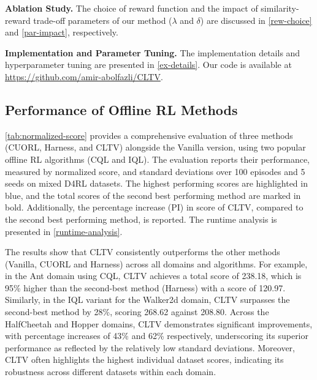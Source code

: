 \vspace{0.5em}
\noindent\textbf{Ablation Study.} The choice of reward function and the impact of similarity-reward trade-off parameters of our method (\(\lambda\) and \(\delta\)) are discussed in \autoref{rew-choice} and \autoref{par-impact}, respectively.


\vspace{0.5em}
\noindent\textbf{Implementation and Parameter Tuning.} The implementation details and hyperparameter tuning are presented in \autoref{ex-details}. Our code
is available at \href{https://github.com/amir-abolfazli/CLTV}{https://github.com/amir-abolfazli/CLTV}.



\subsection{Performance of Offline RL Methods}
\label{subsec-score}
\autoref{tab:normalized-score} provides a comprehensive evaluation of three methods (CUORL, Harness, and CLTV) alongside the Vanilla version, using two popular offline RL algorithms (CQL and IQL). The evaluation reports their performance, measured by normalized score, and standard deviations over 100 episodes and 5 seeds on mixed D4RL datasets. The highest performing scores are highlighted in blue, and the total scores of the second best performing method are marked in bold. Additionally, the percentage increase (PI) in score of CLTV, compared to the second best performing method, is reported. The runtime analysis is presented in \autoref{runtime-analysis}.


The results show that CLTV consistently outperforms the other methods (Vanilla, CUORL and Harness) across all domains and algorithms. For example, in the Ant domain using CQL, CLTV achieves a total score of 238.18, which is 95\% higher than the second-best method (Harness) with a score of 120.97. Similarly, in the IQL variant for the Walker2d domain, CLTV surpasses the second-best method by 28\%, scoring 268.62 against 208.80. Across the HalfCheetah and Hopper domains, CLTV demonstrates significant improvements, with percentage increases of 43\% and 62\% respectively, underscoring its superior performance as reflected by the relatively low standard deviations. Moreover, CLTV often highlights the highest individual dataset scores, indicating its robustness across different datasets within each domain.



